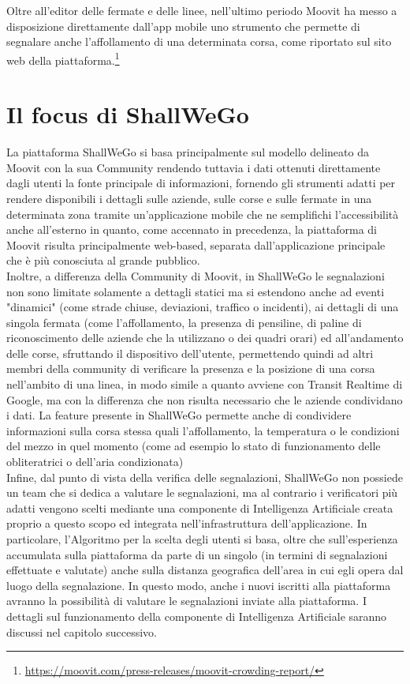     Oltre all'editor delle fermate e delle linee, nell'ultimo periodo Moovit ha messo a disposizione direttamente dall'app mobile uno strumento che permette di segnalare anche l'affollamento di una determinata corsa, come riportato sul sito web della piattaforma.\footnote[4]{\url{https://moovit.com/press-releases/moovit-crowding-report/}}

\section{Il focus di ShallWeGo}
    La piattaforma ShallWeGo si basa principalmente sul modello delineato da Moovit con la sua Community rendendo tuttavia i dati ottenuti direttamente dagli utenti la fonte principale di informazioni, fornendo gli strumenti adatti per rendere disponibili i dettagli sulle aziende, sulle corse e sulle fermate in una determinata zona tramite un'applicazione mobile che ne semplifichi l'accessibilità anche all'esterno in quanto, come accennato in precedenza, la piattaforma di Moovit risulta principalmente web-based, separata dall'applicazione principale che è più conosciuta al grande pubblico. \\
    Inoltre, a differenza della Community di Moovit, in ShallWeGo le segnalazioni non sono limitate solamente a dettagli statici ma si estendono anche ad eventi "dinamici" (come strade chiuse, deviazioni, traffico o incidenti), ai dettagli di una singola fermata (come l'affollamento, la presenza di pensiline, di paline di riconoscimento delle aziende che la utilizzano o dei quadri orari) ed all'andamento delle corse, sfruttando il dispositivo dell'utente, permettendo quindi ad altri membri della community di verificare la presenza e la posizione di una corsa nell'ambito di una linea, in modo simile a quanto avviene con Transit Realtime di Google, ma con la differenza che non risulta necessario che le aziende condividano i dati. La feature presente in ShallWeGo permette anche di condividere informazioni sulla corsa stessa quali l'affollamento, la temperatura o le condizioni del mezzo in quel momento (come ad esempio lo stato di funzionamento delle obliteratrici o dell'aria condizionata) \\
    Infine, dal punto di vista della verifica delle segnalazioni, ShallWeGo non possiede un team che si dedica a valutare le segnalazioni, ma al contrario i verificatori più adatti vengono scelti mediante una componente di Intelligenza Artificiale creata proprio a questo scopo ed integrata nell'infrastruttura dell'applicazione. In particolare, l'Algoritmo per la scelta degli utenti si basa, oltre che sull'esperienza accumulata sulla piattaforma da parte di un singolo (in termini di segnalazioni effettuate e valutate) anche sulla distanza geografica dell'area in cui egli opera dal luogo della segnalazione. In questo modo, anche i nuovi iscritti alla piattaforma avranno la possibilità di valutare le segnalazioni inviate alla piattaforma. I dettagli sul funzionamento della componente di Intelligenza Artificiale saranno discussi nel capitolo successivo.





        

    


